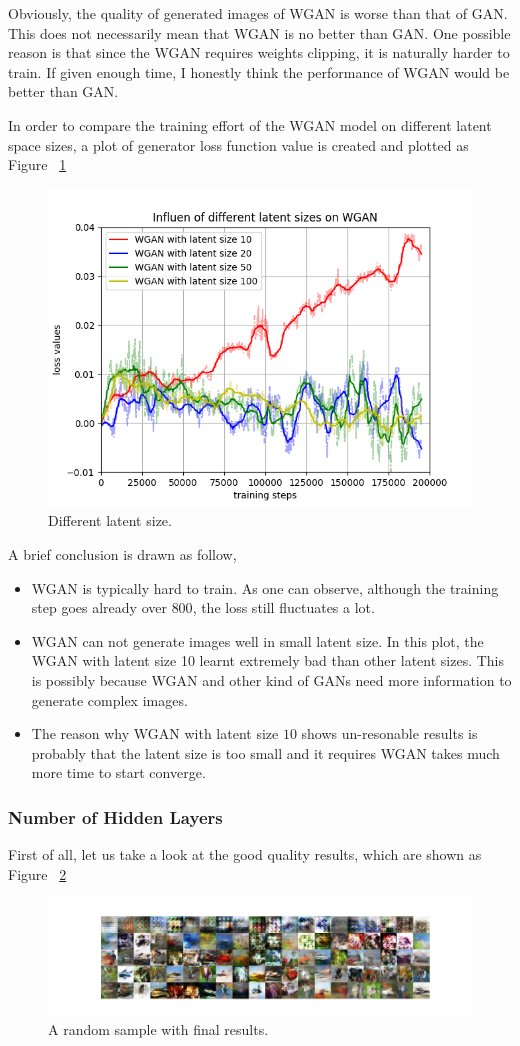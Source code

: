 \documentclass[12pt,letterpaper]{article}
\begin{document}
Obviously, the quality of generated images of WGAN is worse than that of GAN. This does not necessarily mean that WGAN is no better than GAN. One possible reason is that since the WGAN requires weights clipping, it is naturally harder to train. If given enough time, I honestly think the performance of WGAN would be better than GAN.

In order to compare the training effort of the WGAN model on different latent space sizes, a plot of generator loss function value is created and plotted as Figure ~\ref{fig:wgen_latent_CIFAR}
\begin{figure}[h]
    \centering
    \includegraphics[width=.5\linewidth]{WGAN_CIFAR_latents.png}
    \caption{\small Different latent size.}
    \label{fig:wgen_latent_CIFAR}
\end{figure}

A brief conclusion is drawn as follow,
\begin{itemize}
    \item WGAN is typically hard to train. As one can observe, although the training step goes already over $800$, the loss still fluctuates a lot.
    \item WGAN can not generate images well in small latent size. In this plot, the WGAN with latent size 10 learnt extremely bad than other latent sizes. This is possibly because WGAN and other kind of GANs need more information to generate complex images.
    \item The reason why WGAN with latent size $10$ shows un-resonable results is probably that the latent size is too small and it requires WGAN takes much more time to start converge.
\end{itemize}

\subsubsection{Number of Hidden Layers}

First of all, let us take a look at the good quality results, which are shown as Figure ~\ref{fig:CIFAR_WGAN_hidden_results} 
\begin{figure}[h]
    \centering
    \includegraphics[width=.8\linewidth]{WGAN_CIFAR_0_50_256.png}
    \caption{\small A random sample with final results.}
    \label{fig:CIFAR_WGAN_hidden_results}
\end{figure}
\end{document}
